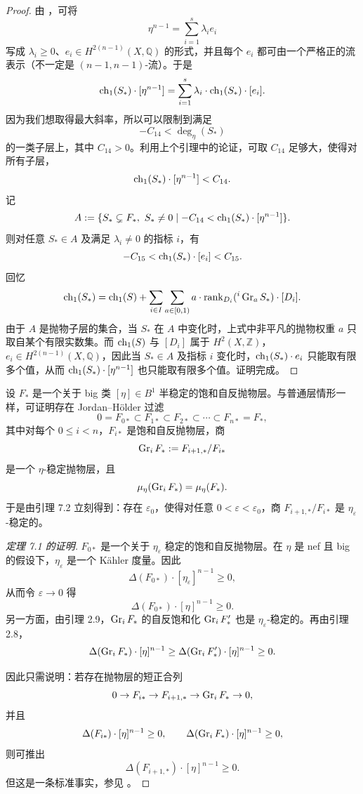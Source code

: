 \begin{proof}
由 \cite[Lemma 2.2]{Ca}，可将
\[
\eta^{n-1}=\sum_{i=1}^s \lambda_i e_i
\]
写成 \(\lambda_i\ge 0\)、\(e_i\in H^{2(n-1)}(X,\mathbb Q)\) 的形式，并且每个 \(e_i\) 都可由一个严格正的流表示（不一定是 \((n-1,n-1)\)-流）。于是
\[
\operatorname{ch}_1(S_*)\cdot [\eta^{n-1}]
=
\sum_{i=1}^s \lambda_i \cdot \operatorname{ch}_1(S_*)\cdot [e_i].
\]
因为我们想取得最大斜率，所以可以限制到满足
\[
-C_{14}<\deg_\eta(S_*)
\]
的一类子层上，其中 \(C_{14}>0\)。利用上个引理中的论证，可取 \(C_{14}\) 足够大，使得对所有子层，
\[
\operatorname{ch}_1(S_*)\cdot [\eta^{n-1}]<C_{14}.
\]
记
\[
A:=\{S_*\subsetneq F_*,\ S_*\ne 0\mid -C_{14}<\operatorname{ch}_1(S_*)\cdot [\eta^{n-1}]\}.
\]
则对任意 \(S_*\in A\) 及满足 \(\lambda_i\ne 0\) 的指标 \(i\)，有
\[
-C_{15}<\operatorname{ch}_1(S_*)\cdot [e_i]<C_{15}.
\]
回忆
\[
\operatorname{ch}_1(S_*)
=
\operatorname{ch}_1(S)
+
\sum_{i\in I}\sum_{a\in[0,1)}
a\cdot \operatorname{rank}_{D_i}({}^i\operatorname{Gr}_aS_*)\cdot [D_i].
\]
由于 \(A\) 是抛物子层的集合，当 \(S_*\) 在 \(A\) 中变化时，上式中非平凡的抛物权重 \(a\) 只取自某个有限实数集。而 \(\operatorname{ch}_1(S)\) 与 \([D_i]\) 属于 \(H^2(X,\mathbb Z)\)，\(e_i\in H^{2(n-1)}(X,\mathbb Q)\)，因此当 \(S_*\in A\) 及指标 \(i\) 变化时，\(\operatorname{ch}_1(S_*)\cdot e_i\) 只能取有限多个值，从而 \(\operatorname{ch}_1(S_*)\cdot [\eta^{n-1}]\) 也只能取有限多个值。证明完成。
\end{proof}

设 \(F_*\) 是一个关于 big 类 \([\eta]\in B^1\) 半稳定的饱和自反抛物层。与普通层情形一样，可证明存在 Jordan--H\"older 过滤
\[
0=F_{0*}\subset F_{1*}\subset F_{2*}\subset \cdots \subset F_{n*}=F_*,
\]
其中对每个 \(0\le i<n\)，\(F_{i*}\) 是饱和自反抛物层，商
\[
\operatorname{Gr}_iF_*:=F_{i+1,*}/F_{i*}
\]
是一个 \(\eta\)-稳定抛物层，且
\[
\mu_\eta(\operatorname{Gr}_iF_*)=\mu_\eta(F_*).
\]
于是由引理 7.2 立刻得到：存在 \(\varepsilon_0\)，使得对任意 \(0<\varepsilon<\varepsilon_0\)，商 \(F_{i+1,*}/F_{i*}\) 是 \(\eta_\varepsilon\)-稳定的。

\begin{proof}[定理 7.1 的证明]
\(F_{0*}\) 是一个关于 \(\eta_\varepsilon\) 稳定的饱和自反抛物层。在 \(\eta\) 是 nef 且 big 的假设下，\(\eta_\varepsilon\) 是一个 Kähler 度量。因此
\[
\Delta(F_{0*})\cdot [\eta_\varepsilon]^{n-1}\ge 0,
\]
从而令 \(\varepsilon\to 0\) 得
\[
\Delta(F_{0*})\cdot [\eta]^{n-1}\ge 0.
\]
另一方面，由引理 2.9，\(\operatorname{Gr}_iF_*\) 的自反饱和化 \(\operatorname{Gr}_iF'_*\) 也是 \(\eta_\varepsilon\)-稳定的。再由引理 2.8，
\[
\Delta(\operatorname{Gr}_iF_*)\cdot [\eta]^{n-1}
\ge
\Delta(\operatorname{Gr}_iF'_*)\cdot [\eta]^{n-1}
\ge 0.
\]

因此只需说明：若存在抛物层的短正合列
\[
0\to F_{i*}\to F_{i+1,*}\to \operatorname{Gr}_iF_*\to 0,
\]
并且
\[
\Delta(F_{i*})\cdot [\eta]^{n-1}\ge 0,\qquad
\Delta(\operatorname{Gr}_iF_*)\cdot [\eta]^{n-1}\ge 0,
\]
则可推出
\[
\Delta(F_{i+1,*})\cdot [\eta]^{n-1}\ge 0.
\]
但这是一条标准事实，参见 \cite[Lemma 3.7]{Cl}。
\end{proof}